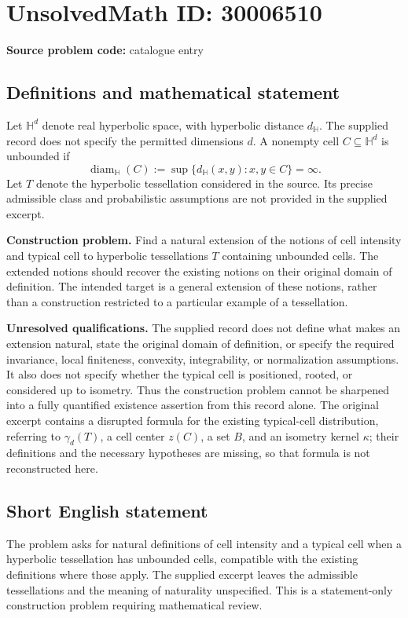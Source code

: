 \documentclass[11pt]{article}
\begin{document}
\section*{UnsolvedMath ID: 30006510}
\textbf{Source problem code:} catalogue entry
\subsection{Definitions and mathematical statement}
Let \(\mathbb H^d\) denote real hyperbolic space, with hyperbolic distance \(d_{\mathbb H}\). The supplied record does not specify the permitted dimensions \(d\). A nonempty cell \(C\subseteq\mathbb H^d\) is unbounded if
\[
\operatorname{diam}_{\mathbb H}(C):=\sup\{d_{\mathbb H}(x,y):x,y\in C\}=\infty.
\]
Let \(T\) denote the hyperbolic tessellation considered in the source. Its precise admissible class and probabilistic assumptions are not provided in the supplied excerpt.

\textbf{Construction problem.} Find a natural extension of the notions of cell intensity and typical cell to hyperbolic tessellations \(T\) containing unbounded cells. The extended notions should recover the existing notions on their original domain of definition. The intended target is a general extension of these notions, rather than a construction restricted to a particular example of a tessellation.

\textbf{Unresolved qualifications.} The supplied record does not define what makes an extension natural, state the original domain of definition, or specify the required invariance, local finiteness, convexity, integrability, or normalization assumptions. It also does not specify whether the typical cell is positioned, rooted, or considered up to isometry. Thus the construction problem cannot be sharpened into a fully quantified existence assertion from this record alone. The original excerpt contains a disrupted formula for the existing typical-cell distribution, referring to \(\gamma_d(T)\), a cell center \(z(C)\), a set \(B\), and an isometry kernel \(\kappa\); their definitions and the necessary hypotheses are missing, so that formula is not reconstructed here.
\subsection{Short English statement}
The problem asks for natural definitions of cell intensity and a typical cell when a hyperbolic tessellation has unbounded cells, compatible with the existing definitions where those apply. The supplied excerpt leaves the admissible tessellations and the meaning of naturality unspecified. This is a statement-only construction problem requiring mathematical review.
\end{document}
